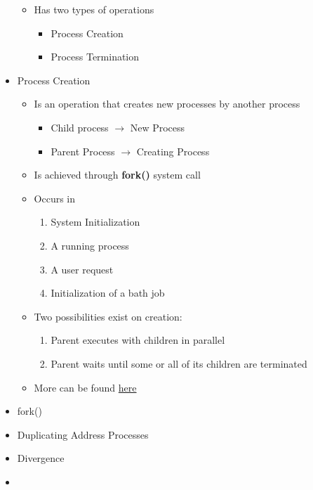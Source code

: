 \documentclass[12pt]{article}
\begin{document}
\begin{itemize}
\begin{itemize}
        \item Has two types of operations
        \begin{itemize}
            \item Process Creation
            \item Process Termination
        \end{itemize}
    \end{itemize}
    \item Process Creation
    \begin{itemize}
        \item Is an operation that creates new processes by another process
        \begin{itemize}
            \item Child process $\to$ New Process
            \item Parent Process $\to$ Creating Process
        \end{itemize}
        \item Is achieved through \textbf{fork()} system call
        \item Occurs in
        \begin{enumerate}[1.]
            \item System Initialization
            \item A running process
            \item A user request
            \item Initialization of a bath job
        \end{enumerate}
        \item Two possibilities exist on creation:
        \begin{enumerate}[1.]
            \item Parent executes with children in parallel
            \item Parent waits until some or all of its children are terminated
        \end{enumerate}
        \item More can be found \href{https://www.youtube.com/watch?v=Zr8WKIOIKsk}{here}
    \end{itemize}
    \item fork()
    \item Duplicating Address Processes
    \item Divergence
    \item
\end{itemize}
\end{document}
